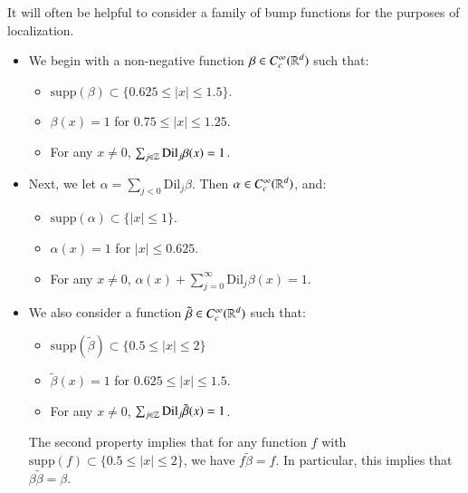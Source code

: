 It will often be helpful to consider a family of bump functions for the purposes of localization.
%
\begin{itemize}
    \item We begin with a non-negative function $\beta \in C_c^\infty(\operatorname{\mathbb{R}}^d)$ such that:
    \begin{itemize}
        \item $\text{supp}(\beta) \subset \{ 0.625 \leq |x| \leq 1.5 \}$.

        \item $\beta(x) = 1$ for $0.75 \leq |x| \leq 1.25$.

        \item For any $x \neq 0$, $\sum_{j \in \operatorname{\mathbb{Z}}} \text{Dil}_j \beta(x) = 1$.
    \end{itemize}
    
    \item Next, we let $\alpha = \sum_{j < 0} \text{Dil}_j \beta$. Then $\alpha \in C_c^\infty(\operatorname{\mathbb{R}}^d)$, and:
    \begin{itemize}
        \item $\text{supp}(\alpha) \subset \{ |x| \leq 1 \}$.

        \item $\alpha(x) = 1$ for $|x| \leq 0.625$.

        \item For any $x \neq 0$, $\alpha(x) + \sum_{j = 0}^\infty \text{Dil}_j \beta(x) = 1$.
    \end{itemize}

    \item We also consider a function $\tilde{\beta} \in C_c^\infty(\operatorname{\mathbb{R}}^d)$ such that:
    \begin{itemize}
        \item $\text{supp}(\tilde{\beta}) \subset \{ 0.5 \leq |x| \leq 2 \}$
        \item $\tilde{\beta}(x) = 1$ for $0.625 \leq |x| \leq 1.5$.
        \item For any $x \neq 0$, $\sum_{j \in \operatorname{\mathbb{Z}}} \text{Dil}_j \tilde{\beta}(x) = 1$.
    \end{itemize}
    The second property implies that for any function $f$ with $\text{supp}(f) \subset \{ 0.5 \leq |x| \leq 2 \}$, we have $f \tilde{\beta} = f$. In particular, this implies that $\beta \tilde{\beta} = \beta$.
\end{itemize}

